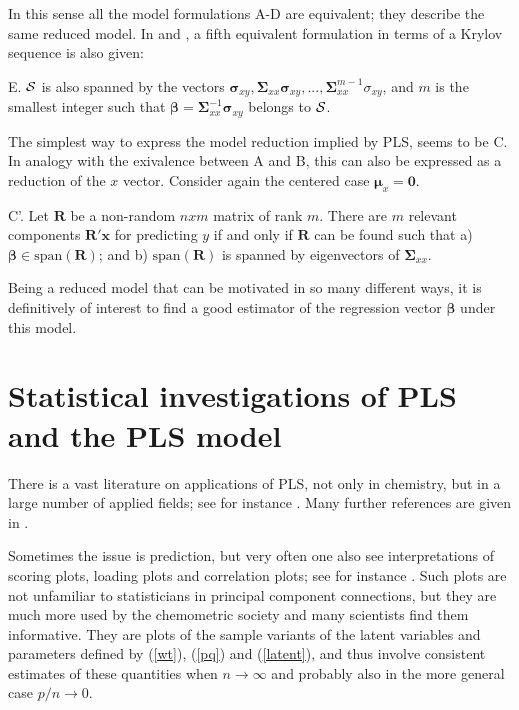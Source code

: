 \documentclass[num-refs]{wiley-article}
\begin{document}
\bigskip

In this sense all the model formulations A-D are equivalent; they describe the same reduced model. In \citet{helland1990partial} and \citet{cook2013envelopes}, a fifth equivalent formulation in terms
of a Krylov sequence is also given:
\smallskip

E. $\cal{S}$ is also spanned by the vectors $ \bm{\sigma}_{xy}, \bm{\Sigma}_{xx}\bm{\sigma}_{xy},..., \bm{\Sigma}_{xx}^{m-1}\sigma_{xy}$, and $m$ is the smallest integer such that $\bm{\beta}=\bm{\Sigma}_{xx}^{-1}\bm{\sigma}_{xy}$ belongs to $\cal{S}$.

\smallskip

The simplest way to express the model reduction implied by PLS, seems to be C. In analogy with the exivalence between A and B, this can also be expressed as a reduction of the $x$ vector. Consider again the centered case $\bm{\mu}_x =\bm{0}$.
\smallskip

C'. Let $\bm{R}$ be a non-random $nxm$ matrix of rank $m$. There are $m$ relevant components $\bm{R'x}$ for predicting $y$ if and only if $\bm{R}$ can be found such that a) $\bm{\beta}\in \mathrm{span}
(\bm{R})$; and b) $\mathrm{span}(\bm{R})$ is spanned by eigenvectors of $\bm{\Sigma}_{xx}$.
\smallskip

Being a reduced model that can be motivated in so many different ways, it is definitively of interest to find a good estimator of the regression vector $\bm{\beta}$ under this model.

\section{Statistical investigations of PLS and the PLS model}

There is a vast literature on applications of PLS, not only in chemistry, but in a large number of applied fields; see for instance \citet{boulesteix2007partial}. Many further references are given in \citet{mehmood2016diversity}.

Sometimes the issue is prediction, but very often one also see interpretations of scoring plots, loading plots and correlation plots; see for instance \citet{martens2001multivariate}. Such plots are not unfamiliar to statisticians in principal component connections, but they are much more used by the chemometric society and many scientists find them informative. They are plots of the sample variants of the latent variables and parameters defined by (\ref{wt}), (\ref{pq}) and (\ref{latent}), and thus involve consistent estimates of these quantities when $n\rightarrow\infty$ and probably also in the more general case $p/n\rightarrow 0$.
\end{document}
